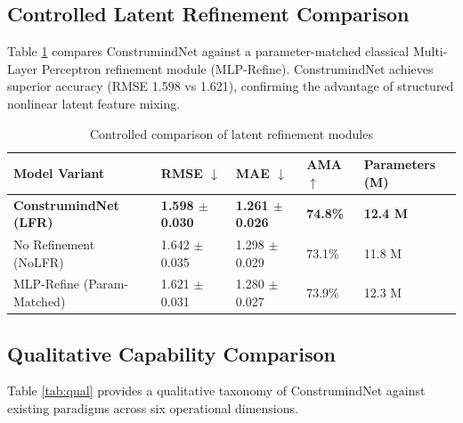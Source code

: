 \documentclass[11pt,a4paper]{article}
\begin{document}
\subsection{Controlled Latent Refinement Comparison}
Table \ref{tab:controlled} compares ConstrumindNet against a parameter-matched classical Multi-Layer Perceptron refinement module (MLP-Refine). ConstrumindNet achieves superior accuracy (RMSE 1.598 vs 1.621), confirming the advantage of structured nonlinear latent feature mixing.

\begin{table}[h]
\centering
\small
\caption{Controlled comparison of latent refinement modules}\label{tab:controlled}
\begin{tabular}{@{}lllll@{}}
\toprule
\textbf{Model Variant} & \textbf{RMSE} $\downarrow$ & \textbf{MAE} $\downarrow$ & \textbf{AMA} $\uparrow$ & \textbf{Parameters (M)} \\
\midrule
\textbf{ConstrumindNet (LFR)} & \textbf{1.598 $\pm$ 0.030} & \textbf{1.261 $\pm$ 0.026} & \textbf{74.8\%} & \textbf{12.4 M} \\
No Refinement (NoLFR) & 1.642 $\pm$ 0.035 & 1.298 $\pm$ 0.029 & 73.1\% & 11.8 M \\
MLP-Refine (Param-Matched) & 1.621 $\pm$ 0.031 & 1.280 $\pm$ 0.027 & 73.9\% & 12.3 M \\
\bottomrule
\end{tabular}
\end{table}

\subsection{Qualitative Capability Comparison}
Table \ref{tab:qual} provides a qualitative taxonomy of ConstrumindNet against existing paradigms across six operational dimensions.
\end{document}
